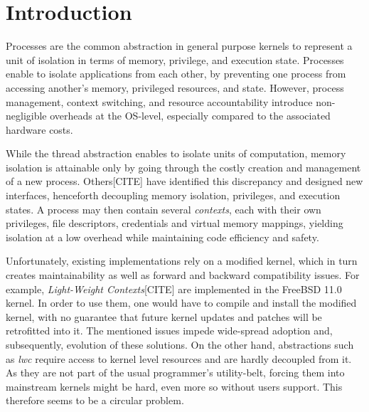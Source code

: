 \chapter{Introduction}

Processes are the common abstraction in general purpose kernels to represent a
unit of isolation in terms of memory, privilege, and execution state.
Processes enable to isolate applications from each other, by preventing one process
from accessing another's memory, privileged resources, and state.
However, process management, context switching, and resource accountability introduce 
non-negligible overheads at the OS-level, especially compared to the associated hardware costs.

While the thread abstraction enables to isolate units of computation,
memory isolation is attainable only by going through the costly creation and management 
of a new process.
Others[CITE] have identified this discrepancy and designed new interfaces, henceforth decoupling
memory isolation, privileges, and execution states.
A process may then contain several \textit{contexts}, each with their own privileges,
file descriptors, credentials and virtual memory mappings, yielding isolation at a low overhead while
maintaining code efficiency and safety.

Unfortunately, existing implementations rely on a modified kernel, which in turn 
creates maintainability as well as forward and backward compatibility issues.
For example, \textit{Light-Weight Contexts}[CITE] are implemented in the FreeBSD 11.0 kernel.
In order to use them, one would have to compile and install the modified kernel,
with no guarantee that future kernel updates and patches will be retrofitted into it.
The mentioned issues impede wide-spread adoption and, subsequently, evolution of these solutions.
On the other hand, abstractions such as \textit{lwc} require access to kernel level resources 
and are hardly decoupled from it.
As they are not part of the usual programmer's utility-belt, forcing them into mainstream 
kernels might be hard, even more so without users support.
This therefore seems to be a circular problem.

